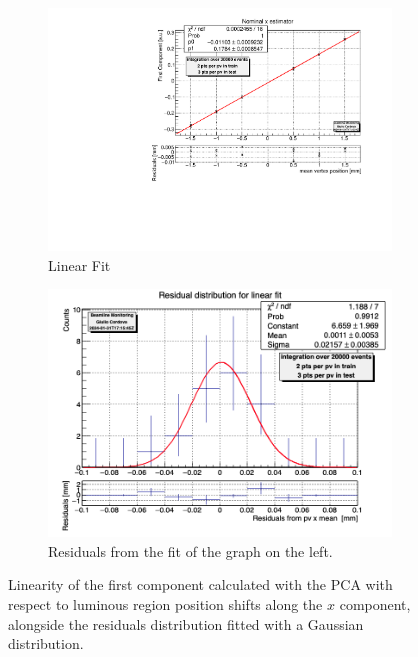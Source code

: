  \begin{figure}
    \centering
    \begin{subfigure}{0.48\textwidth}
    \includegraphics[width=\linewidth]{figures/x_fit_MC.pdf}
    \caption{Linear Fit}\label{fig:xfit_MC}
    \end{subfigure}
    \begin{subfigure}{0.48\textwidth}
    \includegraphics[width=\linewidth]{figures/x_res_MC.png}
    \caption{Residuals from the fit of the graph on the left. }\label{fig:xres_MC}
    \end{subfigure}
    \caption{Linearity of the first component calculated with the PCA with respect to luminous region position shifts along the $x$ component, alongside the residuals distribution fitted with a Gaussian distribution.}
    \label{fig:x_MC}
\end{figure}%
